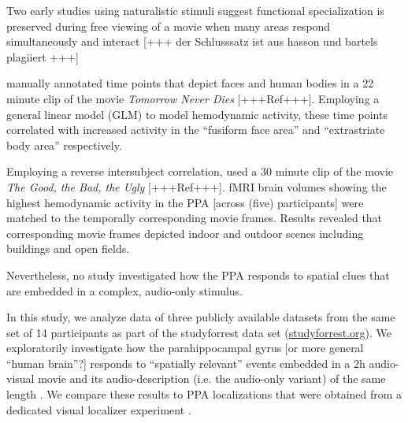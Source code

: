\documentclass[english]{article}
\begin{document}
Two early studies using naturalistic stimuli suggest functional specialization is preserved during free viewing of a movie when many areas respond simultaneously and interact [+++ der Schlusssatz ist aus hasson und bartels plagiiert \citep{bartels2004mapping, hasson2004intersubject}+++]

\citep{bartels2004mapping} manually annotated time points that depict faces and
human bodies in a 22 minute clip of the movie \textit{Tomorrow Never Dies}
[+++Ref+++].
Employing a general linear model (GLM) to model hemodynamic activity, these time
points correlated with increased activity in the ``fusiform face area''
\citep{kanwisher1997ffa} and ``extrastriate body area''
\citep{downing2001bodyarea} respectively.

Employing a reverse intersubject correlation, \citep{hasson2004intersubject}
used a 30 minute clip of the movie \textit{The Good, the Bad, the Ugly}
[+++Ref+++]. fMRI
brain volumes showing the highest hemodynamic activity in the PPA [across (five)
participants] were matched to the temporally corresponding movie frames.
Results revealed that corresponding movie frames depicted indoor and outdoor
scenes including buildings and open fields.

Nevertheless, no study investigated how the PPA responds to spatial clues that are embedded in a complex, audio-only stimulus.





In this study, we analyze data of three publicly available datasets from the
same set of 14 participants as part of the studyforrest data set
(\href{http://www.studyforrest.org}{studyforrest.org}). We exploratorily
investigate how the parahippocampal gyrus [or more general ``human brain''?]
responds to ``spatially relevant'' events embedded in a 2h audio-visual movie
\citep{hanke2016simultaneous} and its audio-description (i.e. the audio-only
variant) of the same length \citep{hanke2014audiomovie}. We compare these
results to PPA localizations that were obtained from a dedicated visual
localizer experiment \citep{sengupta2016extension}.
\end{document}
